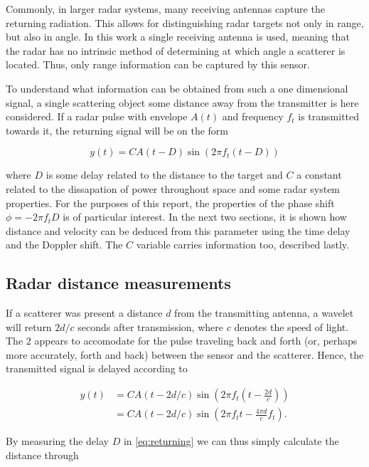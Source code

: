 Commonly, in larger radar systems, many receiving antennas capture the returning radiation. This allows for distinguishing radar targets not only in range, but also in angle. In this work a single receiving antenna is used, meaning that the radar has no intrinsic method of determining at which angle a scatterer is located. Thus, only range information can be captured by this sensor. 

To understand what information can be obtained from such a one dimensional signal, a single scattering object some distance away from the transmitter is here considered. If a radar pulse with envelope $A(t)$ and frequency $f_t$ is transmitted towards it, the returning signal will be on the form \citep{richards_2014}

\begin{equation}\label{eq:returning}
	y(t) = CA(t-D)\sin(2\pi f_t (t-D))
\end{equation}

where $D$ is some delay related to the distance to the target and $C$ a constant related to the dissapation of power throughout space and some radar system properties. For the purposes of this report, the properties of the phase shift $\phi=-2\pi f_tD$ is of particular interest. In the next two sections, it is shown how distance and velocity can be deduced from this parameter using the time delay and the Doppler shift. The $C$ variable carries information too, described lastly. 

\subsection{Radar distance measurements}

If a scatterer was present a distance $d$ from the transmitting antenna, a wavelet will return $2d/c$ seconds after transmission, where $c$ denotes the speed of light. The 2 appears to accomodate for the pulse traveling back and forth (or, perhaps more accurately, forth and back) between the sensor and the scatterer. Hence, the transmitted signal is delayed according to 

\begin{equation}
	\begin{split}
		y(t) 
		& = CA(t-2d/c)\sin(2\pi f_t(t - \frac{2d}{c})) \\
		& = CA(t-2d/c)\sin(2\pi f_tt - \frac{4\pi d}{c}f_t).
	\end{split}
\end{equation}

By measuring the delay $D$ in \ref{eq:returning} we can thus simply calculate the distance through

